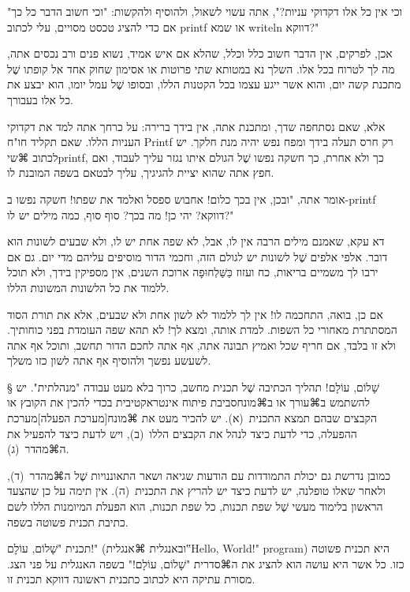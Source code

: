 "וכי אין כל אלו דקדוקי עניות?", אתה עשוי לשאול, ולהוסיף ולהקשות: "וכי חשוב הדבר
כל כך אם כדי להציג טכסט מסויים, עלי לכתוב printf או שמא writeln דווקא?"

אכן, לפרקים, אין הדבר חשוב כלל וכלל, שהלא אם איש אמיד, נשוא פנים ורב נכסים אתה,
מה לך לטרוח בכל אלו. השלך נא במטותא שתי פרוטות או אסימון שחוק אחד אל קופתו שֶׁל
מתכנת קשה יום, והוא אשר ייגע עצמו בכל הקטנות הללו, ובסופו שֶׁל עמל יומו, הוא יבצע
את כל אלו בעבורך.

אלא, שאם נסתחפה שדך, ומתכנת אתה, אין בידך ברירה: על כרחך אתה למד את דקדוקי
העניות הללו. שאם תקליד חו"ח Printf רק חרס תעלה בידך ומפח נפש יהיה מנת חלקך. יש
לכתוב ⌘שי{printf}, כך ולא אחרת, כך חשקה נפשו שֶׁל הגולם איתו נגזר עליך לעבוד, ואם
חפץ אתה שהוא יציית להגיגיך, עליך לבטאם בשפה המובנת לו.

אומר אתה, "ובכן, אין בכך כלום! אחבוש ספסל ואלמד את שפתו! חשקה נפשו ב-printf
דווקא? יהי כן! מה בכך? סוף סוף, כמה מילים יש לו?"

דא עקא, שאמנם מילים הרבה אין לו, אבל, לא שפה אחת יש לו, ולא שבעים לשונות הוא
דובר. אלפי אלפים שֶׁל לשונות יש לגולם הזה, וחכמי הדור מוסיפים עליהם מדי יום. גם
אם ירבו לך משמיים בריאות, כח ועזוז כַּשַּׁלְחוּפָה ארוכת השנים, אין מספיקין בידך, ולא
תוכל ללמוד את כל הלשונות המשונות הללו.

אם כן, בואה, התחכמה לו! אין לך ללמוד לא לשון אחת ולא שבעים,
אלא את תורת הסוד המסתתרת
מאחורי כל השפות. למדת אותה, ומצא לך! לא תהא שפה העומדת בפני כוחותיך. ולא זו
בלבד, אם חריף שכל ואמיץ תבונה אתה, אף אתה לחכם הדור תחשב, ותוכל אף אתה לשעשע
נפשך ולהוסיף אף אתה לשון כזו משלך.

\minitoc

§ שָׁלוֹם, עוֹלָם!
תהליך הכתיבה שֶׁל תכנית מחשב, כרוך בלא מעט עבודה "מנהלתית". יש להשתמש ב⌘עורך
או ב⌘מונח{סביבת פיתוח אינטראקטיבית} בכדי להכין את הקובץ או הקבצים שבהם תמצא
התכנית~(א). יש להכיר מעט את ⌘מונח[מערכת הפעלה]{מערכת ההפעלה}, כדי לדעת כיצד
לנהל את הקבצים הללו~(ב), ויש לדעת כיצד להפעיל את ה⌘מהדר~(ג).

כמובן נדרשת גם יכולת התמודדות עם הודעות שגיאה ושאר התאוננויות שֶׁל ה⌘מהדר~(ד),
ולאחר שאלו טופלנה, יש לדעת כיצד יש להריץ את התכנית~(ה). אין תימה על כן שהצעד
הראשון בלימוד מעשי שֶׁל שפת תכנות, כל שפת תכנות, הוא הפעלת המיומנות הללו לשם
כתיבת תכנית פשוטה בשפה.

תכנית "שָׁלוֹם, עוֹלָם!" (ובאנגלית
⌘אנגלית{‟Hello, World!" program}) היא תכנית פשוטה כזו. כל אשר
היא עושה הוא להציג את ה⌘סדרית "שָׁלוֹם, עוֹלָם!" בשפה האנגלית על פני הצג.
מסורת
עתיקה היא לכתוב כתכנית ראשונה דווקא תכנית זו.

